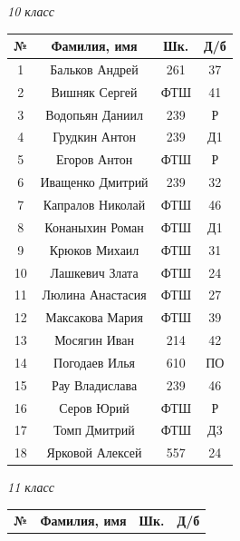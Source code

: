 \documentclass[11pt]{article}
\newlength{\h}
\newlength{\x}
\begin{document}
\begin{table}[ht]
  \begin{minipage}[t]{0.45\linewidth}\centering
    \begin{center}
      \textit{10 класс}
    \end{center}
    \begin{tabular}[h]{|c|c|c|c|}
      \hline
      \textbf{№} & \textbf{Фамилия, имя} & \textbf{Шк.} & \textbf{Д/б}\\
      \hline
      1 & Бальков Андрей & 261 & 37\\ \hline
      2 & Вишняк Сергей & ФТШ & 41 \\ \hline
      3 & Водопьян Даниил & 239 & Р \\ \hline
      4 & Грудкин Антон & 239 & Д1 \\ \hline
      5 & Егоров Антон & ФТШ & Р \\ \hline
      6 & Иващенко Дмитрий & 239 & 32 \\ \hline
      7 & Капралов Николай & ФТШ & 46 \\ \hline
      8 & Конаныхин Роман & ФТШ & Д1 \\ \hline
      9 & Крюков Михаил & ФТШ & 31 \\ \hline
      10 & Лашкевич Злата & ФТШ & 24 \\ \hline
      11 & Люлина Анастасия & ФТШ & 27 \\ \hline
      12 & Максакова Мария & ФТШ & 39 \\ \hline
      13 & Мосягин Иван & 214 & 42 \\ \hline
      14 & Погодаев Илья & 610 & ПО \\ \hline
      15 & Рау Владислава & 239 & 46 \\ \hline
      16 & Серов Юрий & ФТШ & Р \\ \hline
      17 & Томп Дмитрий & ФТШ & Д3 \\ \hline
      18 & Ярковой Алексей & 557 & 24 \\ \hline
    \end{tabular}
  \end{minipage}
  \hfill
  \begin{minipage}[t]{0.45\linewidth}\centering
    \begin{center}
      \textit{11 класс}
    \end{center}
    \begin{tabular}[h]{|c|c|c|c|}
      \hline
      \textbf{№} & \textbf{Фамилия, имя} & \textbf{Шк.} & \textbf{Д/б}\\

\end{tabular}
\end{minipage}
\end{table}
\end{document}
